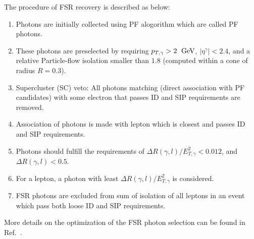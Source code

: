 The procedure of FSR recovery is described as below:\\
\begin{enumerate}
	\item Photons are initially collected using PF alogorithm which are called PF photons.
	\item These photons are preselected by requiring $p_{T,\gamma} > 2~\hbox{$\;\hbox{\rm GeV}$}$, $|\eta^{\gamma}| < 2.4$, and a relative Particle-flow isolation smaller than $1.8$ (computed within a cone of radius $R=0.3$). %
	\item Supercluster (SC) veto: All photons matching (direct association with PF candidates) with some electron that passes ID and SIP requirements are removed. 
\item Association of photons is made with lepton which is closest and passes ID and SIP requirements. %
\item Photons should fulfill the requirements of  $\Delta R(\gamma,l)/E_{T,\gamma}^2 < 0.012$, and $\Delta R(\gamma,l)<0.5$.%
\item For a lepton, a photon with least $\Delta R(\gamma,l)/E_{T,\gamma}^2$ is considered.
\item FSR photons are excluded from sum of isolation of all leptons in an event which pass both loose ID and SIP requirements. %
\end{enumerate}

More details on the optimization of the FSR photon selection can be found in Ref.~\cite{AN-15-277, AN-16-217}.
